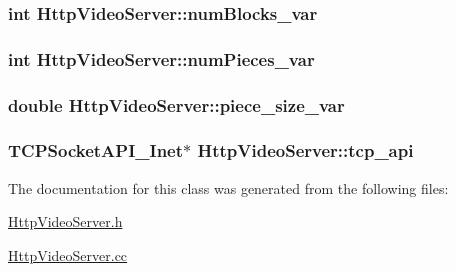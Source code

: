 \subsubsection[{num\+Blocks\+\_\+var}]{\setlength{\rightskip}{0pt plus 5cm}int Http\+Video\+Server\+::num\+Blocks\+\_\+var\hspace{0.3cm}{\ttfamily [protected]}}\label{classHttpVideoServer_a39d06af889c6ae735c472bd5a04d5fc5}
\hypertarget{classHttpVideoServer_ae630ec3629f6a4e00a7a28e583395ee2}{}
\subsubsection[{num\+Pieces\+\_\+var}]{\setlength{\rightskip}{0pt plus 5cm}int Http\+Video\+Server\+::num\+Pieces\+\_\+var\hspace{0.3cm}{\ttfamily [protected]}}\label{classHttpVideoServer_ae630ec3629f6a4e00a7a28e583395ee2}
\hypertarget{classHttpVideoServer_a6cb1c220cced89e22cb6b945013adecb}{}
\subsubsection[{piece\+\_\+size\+\_\+var}]{\setlength{\rightskip}{0pt plus 5cm}double Http\+Video\+Server\+::piece\+\_\+size\+\_\+var\hspace{0.3cm}{\ttfamily [protected]}}\label{classHttpVideoServer_a6cb1c220cced89e22cb6b945013adecb}
\hypertarget{classHttpVideoServer_ab30327bad9fa9a59dad39b759f9e83c0}{}
\subsubsection[{tcp\+\_\+api}]{\setlength{\rightskip}{0pt plus 5cm}T\+C\+P\+Socket\+A\+P\+I\+\_\+\+Inet$\ast$ Http\+Video\+Server\+::tcp\+\_\+api\hspace{0.3cm}{\ttfamily [protected]}}\label{classHttpVideoServer_ab30327bad9fa9a59dad39b759f9e83c0}


The documentation for this class was generated from the following files\+:\begin{DoxyCompactItemize}
\item 
\hyperlink{HttpVideoServer_8h}{Http\+Video\+Server.\+h}\item 
\hyperlink{HttpVideoServer_8cc}{Http\+Video\+Server.\+cc}\end{DoxyCompactItemize}
